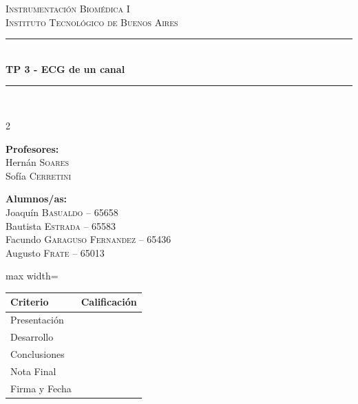\documentclass[10pt]{article}
\newcommand{\materia}{Instrumentación Biomédica I}
\newcommand{\institucion}{Instituto Tecnológico de Buenos Aires}
\newcommand{\numeroTP}{3}
\newcommand{\nombreTP}{ECG de un canal}
\newcommand{\HRule}{\rule{\linewidth}{0.5mm}}
\begin{document}
\begin{center}
    \textsc{\LARGE \materia}\\[0.2cm]
    \textsc{\Large \institucion}\\[0.2cm]
    \HRule\\[0.2cm]
    {\huge\bfseries TP \numeroTP{} - \nombreTP}\\[0.2cm]
    \HRule\\[1cm]

    \begin{multicols}{2}
        \begin{flushleft}
            \large
            \textbf{Profesores:}\\
            Hernán \textsc{Soares}\\
            Sofía \textsc{Cerretini}
        \end{flushleft}

        \columnbreak

        \begin{flushleft}
            \large
            \textbf{Alumnos/as:}\\
            Joaquín \textsc{Basualdo} -- 65658\\
            Bautista \textsc{Estrada} -- 65583\\
            Facundo \textsc{Garaguso Fernandez} -- 65436\\
            Augusto \textsc{Frate} -- 65013
        \end{flushleft}
    \end{multicols}

    \vspace{0.5cm}
    \renewcommand{\arraystretch}{1.6}

    \begin{adjustbox}{max width=\textwidth}
        \begin{tabular}{|p{6cm}|p{7cm}|}
            \hline
            \textbf{Criterio} & \textbf{Calificación} \\ \hline
            Presentación & \\ \hline
            Desarrollo & \\ \hline
            Conclusiones & \\ \hline
            Nota Final & \\ \hline\hline
            Firma y Fecha & \\ \hline
        \end{tabular}
    \end{adjustbox}
\end{center}
\end{document}
